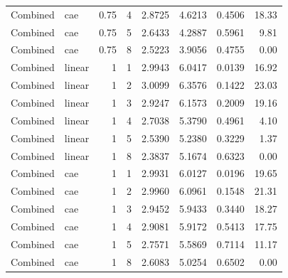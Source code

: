 \begin{longtable}{llrrrrrr}
Combined & cae & 0.75 & 4 & 2.8725 & 4.6213 & 0.4506 & 18.33 \\
Combined & cae & 0.75 & 5 & 2.6433 & 4.2887 & 0.5961 & 9.81 \\
Combined & cae & 0.75 & 8 & 2.5223 & 3.9056 & 0.4755 & 0.00 \\
Combined & linear & 1 & 1 & 2.9943 & 6.0417 & 0.0139 & 16.92 \\
Combined & linear & 1 & 2 & 3.0099 & 6.3576 & 0.1422 & 23.03 \\
Combined & linear & 1 & 3 & 2.9247 & 6.1573 & 0.2009 & 19.16 \\
Combined & linear & 1 & 4 & 2.7038 & 5.3790 & 0.4961 & 4.10 \\
Combined & linear & 1 & 5 & 2.5390 & 5.2380 & 0.3229 & 1.37 \\
Combined & linear & 1 & 8 & 2.3837 & 5.1674 & 0.6323 & 0.00 \\
Combined & cae & 1 & 1 & 2.9931 & 6.0127 & 0.0196 & 19.65 \\
Combined & cae & 1 & 2 & 2.9960 & 6.0961 & 0.1548 & 21.31 \\
Combined & cae & 1 & 3 & 2.9452 & 5.9433 & 0.3440 & 18.27 \\
Combined & cae & 1 & 4 & 2.9081 & 5.9172 & 0.5413 & 17.75 \\
Combined & cae & 1 & 5 & 2.7571 & 5.5869 & 0.7114 & 11.17 \\
Combined & cae & 1 & 8 & 2.6083 & 5.0254 & 0.6502 & 0.00 \\
\end{longtable}\endgroup
